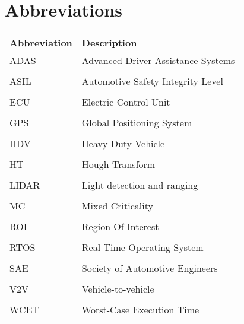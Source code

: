 \chapter*{Abbreviations}
\noindent{}\begin{tabular}{l  l}
\toprule
\textbf{Abbreviation} & \textbf{Description} \vspace{0.3em} \\
\midrule
ADAS	&Advanced Driver Assistance Systems\\
\\[-1em]
ASIL	&Automotive Safety Integrity Level\\
\\[-1em]
ECU		&Electric Control Unit\\
\\[-1em]
GPS		&Global Positioning System\\
\\[-1em]
HDV		&Heavy Duty Vehicle\\
\\[-1em]
HT		&Hough Transform\\
\\[-1em]
LIDAR	&Light detection and ranging\\
\\[-1em]
MC		&Mixed Criticality\\
\\[-1em]
ROI		&Region Of Interest\\
\\[-1em]
RTOS	&Real Time Operating System\\
\\[-1em]
SAE		&Society of Automotive Engineers\\
\\[-1em]
V2V		&Vehicle-to-vehicle\\
\\[-1em]
WCET	&Worst-Case Execution Time\\
\bottomrule

\end{tabular}